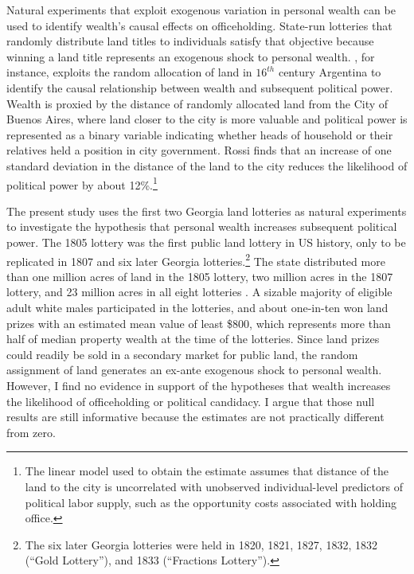Natural experiments that exploit exogenous variation in personal wealth can be used to identify wealth's causal effects on officeholding. State-run lotteries that randomly distribute land titles to individuals satisfy that objective because winning a land title represents an exogenous shock to personal wealth. \citet{rossi2014}, for instance, exploits the random allocation of land in $16^{th}$ century Argentina to identify the causal relationship between wealth and subsequent political power. Wealth is proxied by the distance of randomly allocated land from the City of Buenos Aires, where land closer to the city is more valuable and political power is represented as a binary variable indicating whether heads of household or their relatives held a position in city government. Rossi finds that an increase of one standard deviation in the distance of the land to the city reduces the likelihood of political power by about 12\%.\footnote{The linear model used to obtain the estimate assumes that distance of the land to the city is uncorrelated with unobserved individual-level predictors of political labor supply, such as the opportunity costs associated with holding office.}

The present study uses the first two Georgia land lotteries as natural experiments to investigate the hypothesis that personal wealth increases subsequent political power. The 1805 lottery was the first public land lottery in US history, only to be replicated in 1807 and six later Georgia lotteries.\footnote{The six later Georgia lotteries were held in 1820, 1821, 1827, 1832, 1832 (``Gold Lottery''), and 1833 (``Fractions Lottery'').} The state distributed more than one million acres of land in the 1805 lottery, two million acres in the 1807 lottery, and 23 million acres in all eight lotteries \citep{cadle1991}. A sizable majority of eligible adult white males participated in the lotteries, and about one-in-ten won land prizes with an estimated mean value of least \$800, which represents more than half of median property wealth at the time of the lotteries. Since land prizes could readily be sold in a secondary market for public land, the random assignment of land generates an ex-ante exogenous shock to personal wealth. However, I find no evidence in support of the hypotheses that wealth increases the likelihood of officeholding or political candidacy. I argue that those null results are still informative because the estimates are not practically different from zero. 

